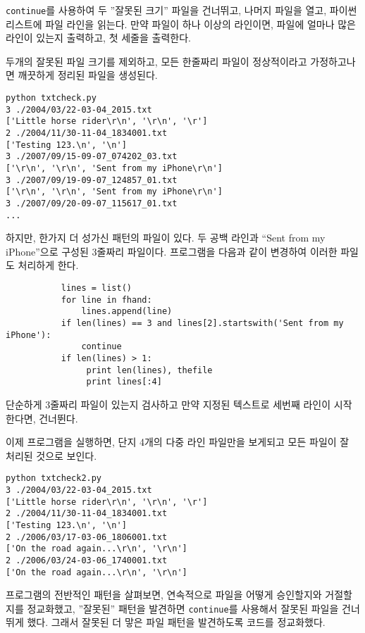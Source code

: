 {\tt continue}를 사용하여 두 ''잘못된 크기'' 파일을 건너뛰고, 
나머지 파일을 열고, 파이썬 리스트에 파일 라인을 읽는다.
만약 파일이 하나 이상의 라인이면, 파일에 얼마나 많은 라인이 있는지 출력하고,
첫 세줄을 출력한다.

두개의 잘못된 파일 크기를 제외하고, 모든 한줄짜리 파일이 정상적이라고 가정하고나면
깨끗하게 정리된 파일을 생성된다.

\beforeverb
\begin{verbatim}
python txtcheck.py 
3 ./2004/03/22-03-04_2015.txt
['Little horse rider\r\n', '\r\n', '\r']
2 ./2004/11/30-11-04_1834001.txt
['Testing 123.\n', '\n']
3 ./2007/09/15-09-07_074202_03.txt
['\r\n', '\r\n', 'Sent from my iPhone\r\n']
3 ./2007/09/19-09-07_124857_01.txt
['\r\n', '\r\n', 'Sent from my iPhone\r\n']
3 ./2007/09/20-09-07_115617_01.txt
...
\end{verbatim}
\afterverb
%

하지만, 한가지 더 성가신 패턴의 파일이 있다. 두 공백 라인과 ``Sent from my iPhone''으로 구성된 3줄짜리 파일이다.
프로그램을 다음과 같이 변경하여 이러한 파일도 처리하게 한다.

\beforeverb
\begin{verbatim}
           lines = list()
           for line in fhand:
               lines.append(line)
           if len(lines) == 3 and lines[2].startswith('Sent from my iPhone'):
               continue
           if len(lines) > 1:
                print len(lines), thefile
                print lines[:4]
\end{verbatim}
\afterverb
%

단순하게 3줄짜리 파일이 있는지 검사하고 만약 지정된 텍스트로 세번째 라인이 시작한다면, 건너뛴다.

이제 프로그램을 실행하면, 단지 4개의 다중 라인 파일만을 보게되고 모든 파일이 잘 처리된 것으로 보인다.

\beforeverb
\begin{verbatim}
python txtcheck2.py 
3 ./2004/03/22-03-04_2015.txt
['Little horse rider\r\n', '\r\n', '\r']
2 ./2004/11/30-11-04_1834001.txt
['Testing 123.\n', '\n']
2 ./2006/03/17-03-06_1806001.txt
['On the road again...\r\n', '\r\n']
2 ./2006/03/24-03-06_1740001.txt
['On the road again...\r\n', '\r\n']
\end{verbatim}
\afterverb
%

프로그램의 전반적인 패턴을 살펴보면, 연속적으로 파일을 어떻게 승인할지와 거절할지를 정교화했고,
''잘못된'' 패턴을 발견하면 {\tt continue}를 사용해서 잘못된 파일을 건너뛰게 했다.
그래서 잘못된 더 맣은 파일 패턴을 발견하도록 코드를 정교화했다.

